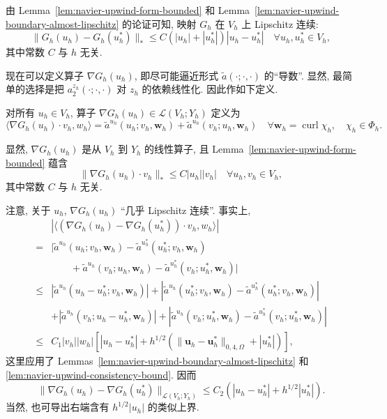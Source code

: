 \setcounter{statement}{0}
\begin{Remark}\label{rem:navier-upwind-gh-lipschitz}
由 Lemma~\ref{lem:navier-upwind-form-bounded} 和
Lemma~\ref{lem:navier-upwind-boundary-almost-lipschitz} 的论证可知,
映射 $G_h$ 在 $V_h$ 上 Lipschitz 连续:
\begin{equation}\label{eq:navier-upwind-gh-lipschitz}
\|G_h(u_h)-G_h(u_h^*)\|_*
\leq C(|u_h|+|u_h^*|)|u_h-u_h^*|
\quad\forall u_h,u_h^*\in V_h,
\end{equation}
其中常数 $C$ 与 $h$ 无关.
\end{Remark}

现在可以定义算子 $\nabla G_h(u_h)$, 即尽可能逼近形式
$\widetilde a(\mathord\cdot;\mathord\cdot,\mathord\cdot)$ 的``导数''.
显然, 最简单的选择是把
$a_2^{z_h}(\mathord\cdot;\mathord\cdot,\mathord\cdot)$ 对 $z_h$ 的依赖线性化.
因此作如下定义.

\setcounter{statement}{0}
\begin{Definition}\label{def:navier-upwind-generalized-gradient}
对所有 $u_h\in V_h$, 算子
$\nabla G_h(u_h)\in\mathcal L(V_h;Y_h)$ 定义为
\[
\langle\nabla G_h(u_h)\cdot v_h,w_h\rangle
=\widetilde a^{u_h}(u_h;v_h,\boldsymbol w_h)
+\widetilde a^{u_h}(v_h;u_h,\boldsymbol w_h)
\quad\forall\boldsymbol w_h=\operatorname{curl}\chi_h,
\quad\chi_h\in\Phi_h.
\]
\end{Definition}

显然, $\nabla G_h(u_h)$ 是从 $V_h$ 到 $Y_h$ 的线性算子, 且
Lemma~\ref{lem:navier-upwind-form-bounded} 蕴含
\[
\|\nabla G_h(u_h)\cdot v_h\|_*
\leq C|u_h||v_h|
\quad\forall u_h,v_h\in V_h,
\]
其中常数 $C$ 与 $h$ 无关.

\setcounter{statement}{1}
\begin{Remark}\label{rem:navier-upwind-gradient-almost-lipschitz}
注意, 关于 $u_h$, $\nabla G_h(u_h)$ ``几乎 Lipschitz 连续''. 事实上,
\[
\begin{aligned}
&|\langle(\nabla G_h(u_h)-\nabla G_h(u_h^*))\cdot v_h,w_h\rangle|\\
={}&|\widetilde a^{u_h}(u_h;v_h,\boldsymbol w_h)
-\widetilde a^{u_h^*}(u_h^*;v_h,\boldsymbol w_h)\\
&\qquad+\widetilde a^{u_h}(v_h;u_h,\boldsymbol w_h)
-\widetilde a^{u_h^*}(v_h;u_h^*,\boldsymbol w_h)|\\
\leq{}&|\widetilde a^{u_h}(u_h-u_h^*;v_h,\boldsymbol w_h)|
+|\widetilde a^{u_h}(u_h^*;v_h,\boldsymbol w_h)
-\widetilde a^{u_h^*}(u_h^*;v_h,\boldsymbol w_h)|\\
&+|\widetilde a^{u_h}(v_h;u_h-u_h^*,\boldsymbol w_h)|
+|\widetilde a^{u_h}(v_h;u_h^*,\boldsymbol w_h)
-\widetilde a^{u_h^*}(v_h;u_h^*,\boldsymbol w_h)|\\
\leq{}&C_1|v_h||w_h|[|u_h-u_h^*|
+h^{1/2}(\|\boldsymbol u_h-\boldsymbol u_h^*\|_{0,4,\Omega}+|u_h^*|)],
\end{aligned}
\]
这里应用了 Lemmas~\ref{lem:navier-upwind-boundary-almost-lipschitz} 和
\ref{lem:navier-upwind-consistency-bound}. 因而
\[
\|\nabla G_h(u_h)-\nabla G_h(u_h^*)\|_{\mathcal L(V_h;Y_h)}
\leq C_2(|u_h-u_h^*|+h^{1/2}|u_h^*|).
\]
当然, 也可导出右端含有 $h^{1/2}|u_h|$ 的类似上界.
\end{Remark}

